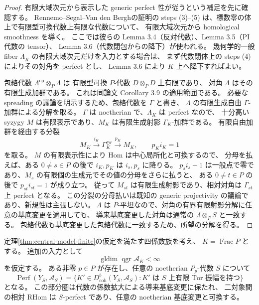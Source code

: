 \begin{proof}
有限大域次元から表示した generic perfect 性が従うという補足を先に確認する。
Rennemo--Segal--Van den Bergh\cite[Proposition~2.1, Lemmas~3.3--3.6, Corollary~3.9]{RSVdB}の証明の
steps (3)--(5) は、標数零の体上で有限型可換代数上有限な代数について、
有限大域次元から homological smoothness を導く。
ここでは彼らの Lemma 3.4（反対代数）、Lemma 3.5（PI 代数の tensor）、
Lemma 3.6（代数閉包からの降下）が使われる。
幾何学的一般 fiber $\Lambda_{\overline K}$ の有限大域次元だけを入力とする場合は、
まず代数閉体上の steps (4) によりその対角を perfect とし、
Lemma 3.6 により $K$ 上へ降下すればよい。

包絡代数 $\Lambda^{\mathrm{op}}\otimes_P\Lambda$ は
有限型可換 $P$-代数 $D\otimes_PD$ 上有限であり、
対角 $\Lambda$ はその有限生成加群である。
これは同論文 Corollary 3.9 の適用範囲である。
必要な spreading の議論を明示するため、包絡代数を $\Gamma$ と書き、
$\Lambda$ の有限生成自由 $\Gamma$-加群による分解を取る。
$\Gamma$ は noetherian で、$\Lambda_K$ は perfect なので、
十分高い syzygy $M$ は有限表示であり、$M_K$ は有限生成射影 $\Gamma_K$-加群である。
有限自由加群を経由する分裂
\[
 M_K\xrightarrow{i_K}\Gamma_K^{\oplus r}
       \xrightarrow{p_K}M_K,\qquad p_Ki_K=1
\]
を取る。
$M$ の有限表示性により Hom は中心局所化と可換するので、
分母を払えば、ある $0\ne s\in P$ の後で $i_K,p_K$ は $i_s,p_s$ に降りる。
$p_si_s-1$ は一般点で零であり、$M_s$ の有限個の生成元でその値の分母をさらに払うと、
ある $0\ne t\in P$ の後で $p_{st}i_{st}=1$ が成り立つ。
従って $M_{st}$ は有限生成射影であり、相対対角は $\Gamma_{st}$ 上 perfect となる。
この分裂の分母払いは既知の generic projectivity の議論であり、新規性は主張しない。
$\Lambda$ は $P$-平坦なので、対角の有界有限射影分解に任意の基底変更を適用しても、
導来基底変更した対角は通常の $\Lambda\otimes_PS$ と一致する。
包絡代数も基底変更した包絡代数に一致するため、所望の分解を得る。
\end{proof}

\begin{proposition}
\label{prop:central-model-intrinsic-perfect-open}
定理\ref{thm:central-model-finite}の仮定を満たす四係数族を考え、
$K=\operatorname{Frac}P$ とする。
追加の入力として
\begin{equation}\label{eq:geometric-generic-tails-input}
 \operatorname{gldim}\operatorname{qgr}\mathcal A_{\overline K}<\infty
\end{equation}
を仮定する。
ある非零 $p\in P$ が存在し、任意の noetherian $P_p$-代数 $S$ について
\[
 \operatorname{Perf}(Y_S,\mathscr A_S)
 =\{K'\in D^b_{\mathrm{coh}}(Y_S,\mathscr A_S):
          K'\text{ は }S\text{ 上有限 Tor 振幅を持つ}\}
\]
となる。
この部分圏は代数の係数拡大による導来基底変更に保たれ、
二対象間の相対 RHom は $S$-perfect であり、任意の noetherian 基底変更と可換する。
\end{proposition}


